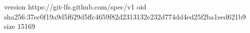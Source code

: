 version https://git-lfs.github.com/spec/v1
oid sha256:37ec0f19a9d5f629d5ffc4659f82d2313132e232d774dd4ed25f2ba1eed621b9
size 15169
